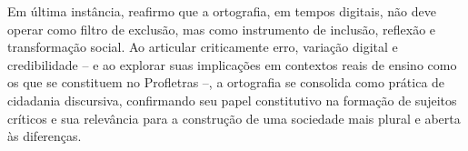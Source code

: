 \documentclass[portuguese]{textolivre}
\begin{document}
Em última instância, reafirmo que a ortografia, em tempos digitais, não deve operar como filtro de exclusão, mas como instrumento de inclusão, reflexão e transformação social. Ao articular criticamente erro, variação digital e credibilidade – e ao explorar suas implicações em contextos reais de ensino como os que se constituem no Profletras –, a ortografia se consolida como prática de cidadania discursiva, confirmando seu papel constitutivo na formação de sujeitos críticos e sua relevância para a construção de uma sociedade mais plural e aberta às diferenças.

\printbibliography\label{sec-bib}


\begin{dataavailability}
\end{dataavailability}
\end{document}
